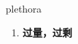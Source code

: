 
\begin{frame}
{\huge plethora}
\begin{center}
\begin{enumerate}\Large
  \item \textbf{过量，过剩}
\end{enumerate}
\end{center}
\end{frame}
